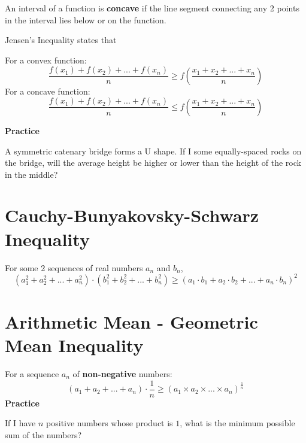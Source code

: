 An interval of a function is \textbf{concave} if the line segment connecting any 2 points in the interval lies below or on the function.

Jensen's Inequality states that

For a convex function:
\[\frac{f(x_1) + f(x_2) + ... + f(x_n)}{n} \geq f \left( \frac{x_1 + x_2 + ... + x_n}{n} \right ) \]
For a concave function:
\[\frac{f(x_1) + f(x_2) + ... + f(x_n)}{n} \leq f \left( \frac{x_1 + x_2 + ... + x_n}{n} \right ) \]

\textbf{Practice}
\begin{center}\end{center}
A symmetric catenary bridge forms a U shape. If I some equally-spaced rocks on the bridge, will the average
height be higher or lower than the height of the rock in the middle?
\section{Cauchy-Bunyakovsky-Schwarz Inequality}
For some 2 sequences of real numbers $a_n$ and $b_n$,
\[(a_1^2 + a_2^2 + ... + a_n^2) \cdot (b_1^2 + b_2^2 + ... + b_n^2) \geq (a_1 \cdot b_1 + a_2 \cdot b_2 + ... + a_n \cdot b_n)^2 \]

\section{Arithmetic Mean - Geometric Mean Inequality}
For a sequence $a_n$ of \textbf{non-negative} numbers:
\[\left(a_1 + a_2 + ... + a_n\right) \cdot \frac{1}{n} \geq (a_1 \times a_2 \times  ... \times a_n)^{\frac{1}{n}} \]
\textbf{Practice}

If I have $n$ positive numbers whose product is $1$, what is the minimum possible sum of the numbers?

